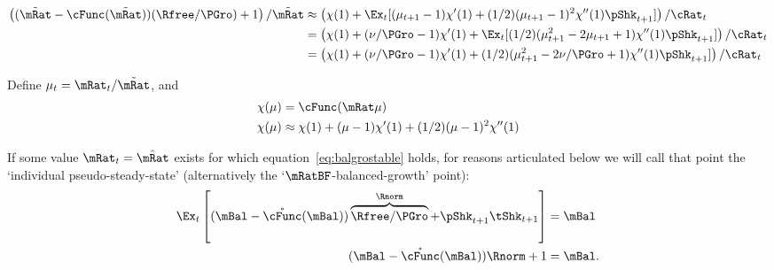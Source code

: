 \documentclass[\econtexRoot/BufferStockTheory]{subfiles}
\begin{document}
\begin{align*}
  \left((\tilde{\mRat}-\cFunc(\tilde{\mRat}))(\Rfree/\PGro)+1\right)/\tilde{\mRat} & \approx \left(\chi(1)+\Ex_{t}[(\mu_{t+1}-1)\chi^{\prime}(1)+(1/2)(\mu_{t+1}-1)^{2}\chi^{\prime\prime}(1)\pShk_{t+1}]\right)/\cRat_{t}
  \\ & = \left(\chi(1)+(\nu/\PGro-1)\chi^{\prime}(1)+\Ex_{t}[(1/2)(\mu_{t+1}^{2}-2 \mu_{t+1}+1)\chi^{\prime\prime}(1)\pShk_{t+1}]\right)/\cRat_{t}
  \\ & = \left(\chi(1)+(\nu/\PGro-1)\chi^{\prime}(1)+(1/2)(\mu_{t+1}^{2}-2 \nu/\PGro+1)\chi^{\prime\prime}(1)\pShk_{t+1}]\right)/\cRat_{t}
\end{align*}

  Define $\mu_{t}=\mRat_{t}/\tilde{\mRat}$, and 
  \begin{equation}\begin{gathered}\begin{aligned}
    \chi(\mu) & =\cFunc(\mRat \mu)
\\ \chi(\mu)  & \approx \chi(1) + (\mu-1)\chi^{\prime}(1) + (1/2)(\mu-1)^{2}\chi^{\prime\prime}(1)
  \end{aligned}\end{gathered}\end{equation}


  
  
\hypertarget{balgrostableSolve}{}
If some value $\mRat_{t}=\hat{\mRat}$ exists for which equation~\eqref{eq:balgrostable} holds, for reasons articulated below we will call that point the `individual pseudo-steady-state' (alternatively the `$\mRatBF$-balanced-growth' point):
\begin{equation}\begin{gathered}\begin{aligned}
  \Ex_{t}\left[(\mBal-\mathring{\cFunc}(\mBal))\overbrace{\Rfree/\PGro}^{\Rnorm}+\pShk_{t+1}\tShk_{t+1}\right] & = \mBal \notag
\\  (\mBal-\mathring{\cFunc}(\mBal))\Rnorm+ 1 & = \mBal \label{eq:balgrostableSolve}.  
\end{aligned}\end{gathered}\end{equation}
\end{document}
